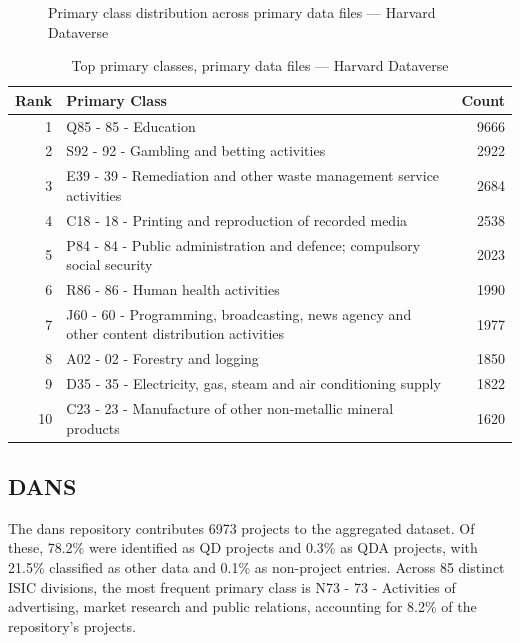 \clearpage

\begin{figure}[H]
    \centering
    
    \caption{Primary class distribution across primary data files --- Harvard Dataverse}
\end{figure}

\begin{table}[H]
    \centering
    \begin{tabular}{r p{10cm} r}
    \hline
    \textbf{Rank} & \textbf{Primary Class} & \textbf{Count} \\
    \hline
    1 & Q85 - 85 - Education & 9666 \\
    2 & S92 - 92 - Gambling and betting activities & 2922 \\
    3 & E39 - 39 - Remediation and other waste management service activities & 2684 \\
    4 & C18 - 18 - Printing and reproduction of recorded media & 2538 \\
    5 & P84 - 84 - Public administration and defence; compulsory social security & 2023 \\
    6 & R86 - 86 - Human health activities & 1990 \\
    7 & J60 - 60 - Programming, broadcasting, news agency and other content distribution activities & 1977 \\
    8 & A02 - 02 - Forestry and logging & 1850 \\
    9 & D35 - 35 - Electricity, gas, steam and air conditioning supply & 1822 \\
    10 & C23 - 23 - Manufacture of other non-metallic mineral products & 1620 \\
    \hline
    \end{tabular}
    \caption{Top primary classes, primary data files --- Harvard Dataverse}
\end{table}

\clearpage

\subsection{DANS}


The dans repository contributes 6973 projects to the aggregated dataset. Of these, 78.2\% were identified as QD projects and 0.3\% as QDA projects, with 21.5\% classified as other data and 0.1\% as non-project entries. Across 85 distinct ISIC divisions, the most frequent primary class is N73 - 73 - Activities of advertising, market research and public relations, accounting for 8.2\% of the repository's projects.


